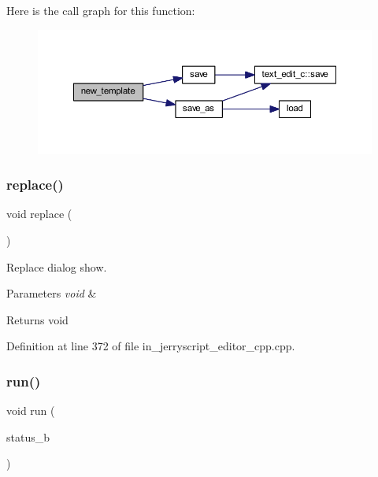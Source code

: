 Here is the call graph for this function\+:
\nopagebreak
\begin{figure}[H]
\begin{center}
\leavevmode
\includegraphics[width=350pt]{group___editor_ga9b68cbeec78749fe78f75c3a94ab47f4_cgraph}
\end{center}
\end{figure}
\mbox{\label{group___editor_gac444d1d43a4b21e9aa8a6b948c0b4c82}} 
\subsubsection{replace()}
{\footnotesize\ttfamily void replace (\begin{DoxyParamCaption}\item[{void}]{ }\end{DoxyParamCaption})}



Replace dialog show. 


\begin{DoxyParams}{Parameters}
{\em void} & \\
\hline
\end{DoxyParams}
\begin{DoxyReturn}{Returns}
void 
\end{DoxyReturn}


Definition at line 372 of file in\+\_\+jerryscript\+\_\+editor\+\_\+cpp.\+cpp.

\mbox{\label{group___editor_ga7f023340b8930afdb091542b289c015b}} 
\subsubsection{run()}
{\footnotesize\ttfamily void run (\begin{DoxyParamCaption}\item[{bool}]{status\+\_\+b }\end{DoxyParamCaption})}



